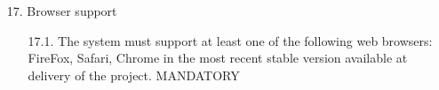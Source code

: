\begin{enumerate}
\begin{enumerate}
	\end{enumerate}


\item[17.] Browser support

	\begin{enumerate}
	\item[17.1.] The system must support at least one of the following web browsers: FireFox, Safari,
	Chrome in the most recent stable version available at delivery of the project. MANDATORY
	\end{enumerate}

\end{enumerate}




